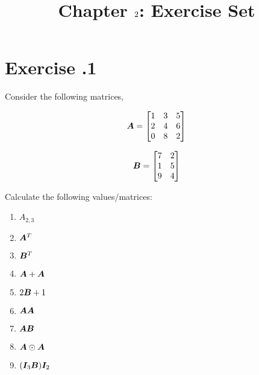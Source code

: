 \documentclass{article}
\title{Chapter $2$: Exercise Set}
\begin{document}
\maketitle

\section*{Exercise \chapnumber.1}
Consider the following matrices,

\begin{equation}
{\bm{A}}
=
\begin{bmatrix}
    1 & 3 & 5 \\
    2 & 4 & 6 \\
    0 & 8 & 2 
\end{bmatrix}
\end{equation}

\begin{equation}
{\bm{B}}
=
\begin{bmatrix}
    7 & 2 \\
    1 & 5 \\
    9 & 4 
\end{bmatrix}
\end{equation}

Calculate the following values/matrices:

\begin{enumerate}[label=(\alph*)]

\item $\textit{A}_{2,3}$
\item ${\bm{A}}^T$
\item ${\bm{B}}^T$
\item ${\bm{A}}+{\bm{A}}$
\item $2{\bm{B}}+1$
\item ${\bm{A}}{\bm{A}}$
\item ${\bm{A}}{\bm{B}}$
\item ${\bm{A}}\odot{\bm{A}}$
\item $({\bm{I}}_{3}{\bm{B}}){\bm{I}}_{2}$

\end{enumerate} 
\end{document}
